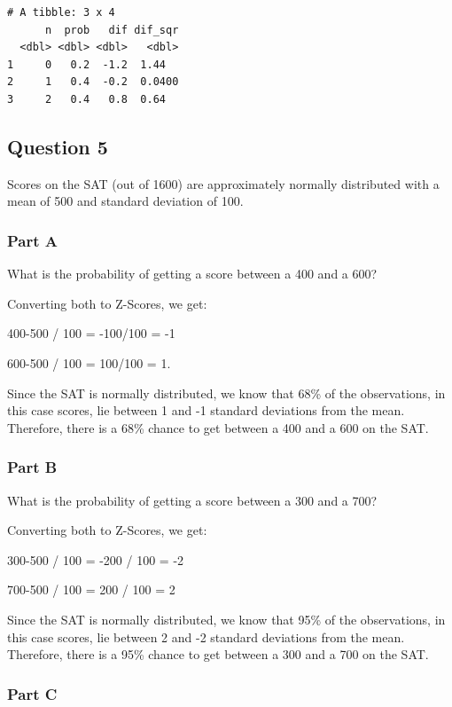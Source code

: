\documentclass[
  letterpaper,
  DIV=11,
  numbers=noendperiod]{scrartcl}
\begin{document}
\begin{verbatim}
# A tibble: 3 x 4
      n  prob   dif dif_sqr
  <dbl> <dbl> <dbl>   <dbl>
1     0   0.2  -1.2  1.44  
2     1   0.4  -0.2  0.0400
3     2   0.4   0.8  0.64  
\end{verbatim}

\hypertarget{question-5}{%
\subsection{Question 5}\label{question-5}}

Scores on the SAT (out of 1600) are approximately normally distributed
with a mean of 500 and standard deviation of 100.

\hypertarget{part-a-3}{%
\subsubsection{Part A}\label{part-a-3}}

What is the probability of getting a score between a 400 and a 600?

Converting both to Z-Scores, we get:

400-500 / 100 = -100/100 = -1

600-500 / 100 = 100/100 = 1.

Since the SAT is normally distributed, we know that 68\% of the
observations, in this case scores, lie between 1 and -1 standard
deviations from the mean. Therefore, there is a 68\% chance to get
between a 400 and a 600 on the SAT.

\hypertarget{part-b-3}{%
\subsubsection{Part B}\label{part-b-3}}

What is the probability of getting a score between a 300 and a 700?

Converting both to Z-Scores, we get:

300-500 / 100 = -200 / 100 = -2

700-500 / 100 = 200 / 100 = 2

Since the SAT is normally distributed, we know that 95\% of the
observations, in this case scores, lie between 2 and -2 standard
deviations from the mean. Therefore, there is a 95\% chance to get
between a 300 and a 700 on the SAT.

\hypertarget{part-c-1}{%
\subsubsection{Part C}\label{part-c-1}}
\end{document}
